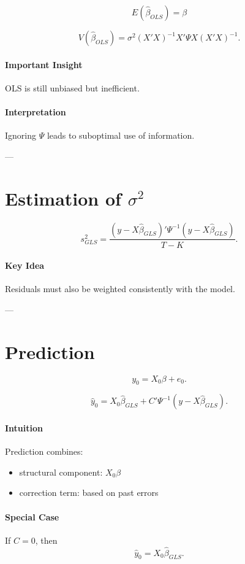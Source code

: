 \[
E(\hat{\beta}_{OLS})=\beta
\]

\[
V(\hat{\beta}_{OLS})
=
\sigma^2 (X'X)^{-1}X'\Psi X(X'X)^{-1}.
\]

\paragraph{Important Insight}
OLS is still unbiased but inefficient.

\paragraph{Interpretation}
Ignoring $\Psi$ leads to suboptimal use of information.

---

\section{Estimation of $\sigma^2$}

\[
s^2_{GLS}
=
\frac{
(y-X\hat{\beta}_{GLS})'\Psi^{-1}(y-X\hat{\beta}_{GLS})
}{T-K}.
\]

\paragraph{Key Idea}
Residuals must also be weighted consistently with the model.

---

\section{Prediction}

\[
y_0 = X_0\beta + e_0.
\]

\[
\hat{y}_0
=
X_0\hat{\beta}_{GLS}
+
C'\Psi^{-1}(y-X\hat{\beta}_{GLS}).
\]

\paragraph{Intuition}
Prediction combines:
\begin{itemize}
    \item structural component: $X_0\beta$
    \item correction term: based on past errors
\end{itemize}

\paragraph{Special Case}
If $C=0$, then
\[
\hat{y}_0 = X_0\hat{\beta}_{GLS}.
\]


